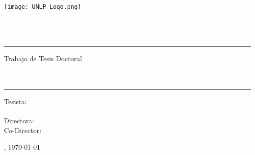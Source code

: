 \pagestyle{empty}
	\begin{center}

		\texttt{[image: UNLP\_Logo.png]}\\[1.5cm]%

		{\LARGE \textsc{\myUni}}\\[0.3cm]
		{\Large \textsc{\myFaculty}}\\[0.3cm]
		{\Large \textsc{\myDepartment}}\\[2cm]

		\hrule
		{\Large Trabajo de Tesis Doctoral}\\[1cm]
		
		{\Huge \textbf{\myTitle}}\\[1cm] %
		{\Huge \textit{\mySubtitle}}\\[0.6cm]
		\hrule

		\vspace{1cm}

		{
			\Large
			Tesista:\\
			\myName
		}\\[1.5cm]

		{
			\Large
			Directora: \myProf\\
			Co-Director: \myOtherProf\\
		}

		\vfill
		\large \myLocation, \today

	\end{center}
